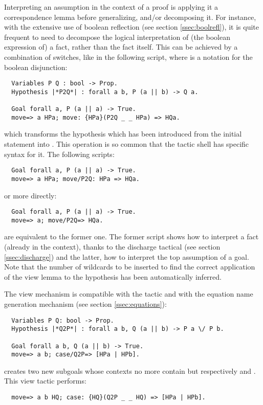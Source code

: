 Interpreting an assumption in the context of a proof is applying it a
correspondence lemma before generalizing, and/or decomposing it.
For instance, with the extensive use of boolean reflection (see
section \ref{ssec:boolrefl}), it is
quite frequent to need to decompose the logical interpretation of (the
boolean expression of) a
fact, rather than the fact itself.
This can be achieved by a combination of 
switches, like in the following script, where \C{||} is a notation for
the boolean disjunction:
\begin{lstlisting}
  Variables P Q : bool -> Prop.
  Hypothesis |*P2Q*| : forall a b, P (a || b) -> Q a.

  Goal forall a, P (a || a) -> True.
  move=> a HPa; move: {HPa}(P2Q _ _ HPa) => HQa.
\end{lstlisting}
which transforms the hypothesis  which has been
introduced from the initial statement into .
This operation is so common that the tactic shell has
specific syntax for it.
The following scripts:
\begin{lstlisting}
  Goal forall a, P (a || a) -> True.
  move=> a HPa; move/P2Q: HPa => HQa.
\end{lstlisting}
or more directly:
\begin{lstlisting}
  Goal forall a, P (a || a) -> True.
  move=> a; move/P2Q=> HQa.
\end{lstlisting}
are equivalent to the former one. The former script shows how to
interpret a fact (already in the context), thanks to the discharge
tactical (see section \ref{ssec:discharge}) and the latter, how to
interpret the top assumption of a goal. Note
that the number of wildcards to be inserted to find the correct
application of the view lemma to the hypothesis has been automatically
inferred.

The view mechanism is compatible with the  tactic and with the
equation name generation mechanism (see section \ref{ssec:equations}):
\begin{lstlisting}
  Variables P Q: bool -> Prop.
  Hypothesis |*Q2P*| : forall a b, Q (a || b) -> P a \/ P b.

  Goal forall a b, Q (a || b) -> True.
  move=> a b; case/Q2P=> [HPa | HPb].
\end{lstlisting}
creates two new subgoals whose contexts no more contain
 but respectively  and
. This view tactic
performs:
\begin{lstlisting}
  move=> a b HQ; case: {HQ}(Q2P _ _ HQ) => [HPa | HPb].
\end{lstlisting}

